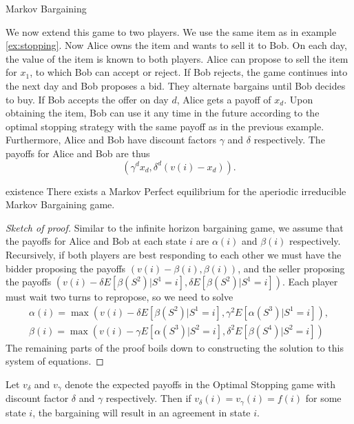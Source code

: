 \begin{aexample}{Markov Bargaining}{}
    
We now extend this game to two players. We use the same item as in example \ref{ex:stopping}. Now Alice owns the item and wants to sell it to Bob. On each day, the value of the item is known to both players. Alice can propose to sell the item for $x_1$, to which Bob can accept or reject. If Bob rejects, the game continues into the next day and Bob proposes a bid. They alternate bargains until Bob decides to buy. If Bob accepts the offer on day $d$, Alice gets a payoff of $x_d$. Upon obtaining the item, Bob can use it any time in the future according to the optimal stopping strategy with the same payoff as in the previous example. Furthermore, Alice and Bob have discount factors $\gamma$ and $\delta$ respectively. The payoffs for Alice and Bob are thus \[
    (\gamma^d x_d, \delta^d(v(i)-x_d)).
    \]
\end{aexample}
\begin{atheorem}{}{existence}
    There exists a Markov Perfect equilibrium for the aperiodic irreducible Markov Bargaining game.
\end{atheorem}
\begin{proof}[Sketch of proof]
    Similar to the infinite horizon bargaining game, we assume that the payoffs for Alice and Bob at each state $i$ are $\alpha(i)$ and $\beta(i)$ respectively. Recursively, if both players are best responding to each other we must have the bidder proposing the payoffs $(v(i)-\beta(i),\beta(i))$, and the seller proposing the payoffs $(v(i)-\delta E[\beta(S^{2})|S^1=i],\delta E[\beta(S^{2})|S^1=i])$. Each player must wait two turns to repropose, so we need to solve \begin{align*}
        \alpha(i) = \max(v(i) -\delta E[\beta(S^{2})|S^1=i] , \gamma^2  E[\alpha(S^{3})|S^1=i] ),\\
        \beta(i) = \max(v(i) -\gamma E[\alpha(S^{3})|S^2=i] , \delta^2  E[\beta(S^{4})|S^2=i] )
    \end{align*}
    The remaining parts of the proof boils down to constructing the solution to this system of equations.
\end{proof}
\begin{alemma}{}{}
    Let $v_\delta$ and $v_\gamma$ denote the expected payoffs in the Optimal Stopping game with discount factor $\delta$ and $\gamma$ respectively.
    Then if $v_\delta(i)=v_\gamma (i) = f(i)$ for some state $i$, the bargaining will result in an agreement in state $i$.
\end{alemma}
